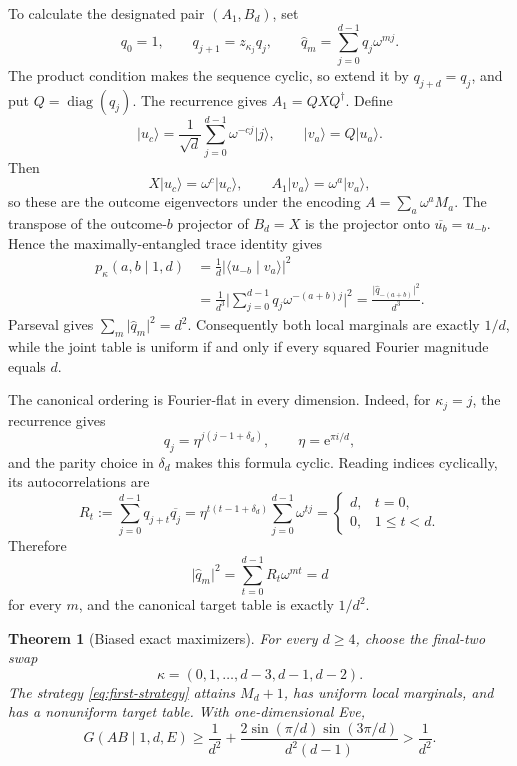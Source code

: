 \documentclass[11pt]{article}
\newtheorem{theorem}{Theorem}[section]
\theoremstyle{definition}
\theoremstyle{remark}
\newcommand{\e}{\mathrm e}
\newcommand{\absop}[1]{\lvert #1\rvert}
\begin{document}
To calculate the designated pair \((A_1,B_d)\), set
\begin{equation}
 q_0=1,
 \qquad q_{j+1}=z_{\kappa_j}q_j,
 \qquad
 \widehat q_m=\sum_{j=0}^{d-1}q_j\omega^{mj}.
 \label{eq:q-sequence}
\end{equation}
The product condition makes the sequence cyclic, so extend it by
\(q_{j+d}=q_j\), and put \(Q=\operatorname{diag}(q_j)\).  The recurrence
gives \(A_1=QXQ^\dagger\).  Define
\[
 \lvert u_c\rangle
 =\frac1{\sqrt d}\sum_{j=0}^{d-1}\omega^{-cj}\lvert j\rangle,
 \qquad
 \lvert v_a\rangle=Q\lvert u_a\rangle.
\]
Then
\[
 X\lvert u_c\rangle=\omega^c\lvert u_c\rangle,
 \qquad
 A_1\lvert v_a\rangle=\omega^a\lvert v_a\rangle,
\]
so these are the outcome eigenvectors under the encoding
\(A=\sum_a\omega^aM_a\).  The transpose of the outcome-\(b\) projector of
\(B_d=X\) is the projector onto \(\overline{u_b}=u_{-b}\).  Hence the
maximally-entangled trace identity gives
\begin{equation}
\begin{aligned}
 p_\kappa(a,b\mid1,d)
 &=\frac1d\absop{\langle u_{-b}\mid v_a\rangle}^2\\
 &=\frac1{d^3}
   \absop{\sum_{j=0}^{d-1}q_j\omega^{-(a+b)j}}^2
 =\frac{\absop{\widehat q_{-(a+b)}}^2}{d^3}.
\end{aligned}
 \label{eq:target-table}
\end{equation}
Parseval gives \(\sum_m\absop{\widehat q_m}^2=d^2\).  Consequently both
local marginals are exactly \(1/d\), while the joint table is uniform if and
only if every squared Fourier magnitude equals \(d\).

The canonical ordering is Fourier-flat in every dimension.  Indeed, for
\(\kappa_j=j\), the recurrence gives
\[
 q_j=\eta^{j(j-1+\delta_d)},
 \qquad \eta=\e^{\pi i/d},
\]
and the parity choice in \(\delta_d\) makes this formula cyclic.  Reading
indices cyclically, its autocorrelations are
\[
 R_t:=\sum_{j=0}^{d-1}q_{j+t}\overline{q_j}
 =\eta^{t(t-1+\delta_d)}
   \sum_{j=0}^{d-1}\omega^{tj}
 =\begin{cases}d,&t=0,\\0,&1\leq t<d.\end{cases}
\]
Therefore
\[
 \absop{\widehat q_m}^2
 =\sum_{t=0}^{d-1}R_t\omega^{mt}=d
\]
for every \(m\), and the canonical target table is exactly \(1/d^2\).

\begin{theorem}[Biased exact maximizers]
\label{thm:biased}
For every \(d\geq4\), choose the final-two swap
\begin{equation}
 \kappa=(0,1,\ldots,d-3,d-1,d-2).
 \label{eq:final-swap}
\end{equation}
The strategy \eqref{eq:first-strategy} attains \(M_d+1\), has uniform local
marginals, and has a nonuniform target table.  With one-dimensional Eve,
\begin{equation}
 G(AB\mid1,d,E)
 \geq\frac1{d^2}
 +\frac{2\sin(\pi/d)\sin(3\pi/d)}{d^2(d-1)}
 >\frac1{d^2}.
 \label{eq:guessing-gap}
\end{equation}
\end{theorem}
\end{document}
